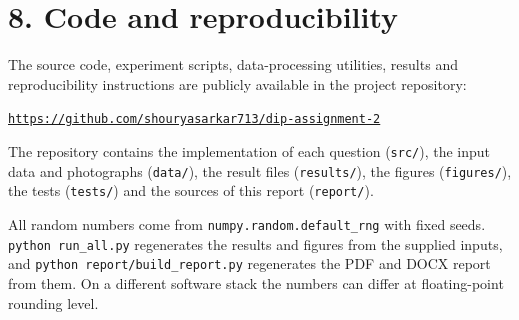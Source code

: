 \documentclass[10pt,a4paper]{article}
\begin{document}
\section{8. Code and reproducibility}
The source code, experiment scripts, data-processing utilities, results and reproducibility instructions are publicly available in the project repository:

\href{https://github.com/shouryasarkar713/dip-assignment-2}{\texttt{https:/\allowbreak{}/\allowbreak{}github.\allowbreak{}com/\allowbreak{}shouryasarkar713/\allowbreak{}dip-assignment-2}}

The repository contains the implementation of each question (\texttt{src/\allowbreak{}}), the input data and photographs (\texttt{data/\allowbreak{}}), the result files (\texttt{results/\allowbreak{}}), the figures (\texttt{figures/\allowbreak{}}), the tests (\texttt{tests/\allowbreak{}}) and the sources of this report (\texttt{report/\allowbreak{}}).

All random numbers come from \texttt{numpy.\allowbreak{}random.\allowbreak{}default\_\allowbreak{}rng} with fixed seeds. \texttt{python run\_\allowbreak{}all.\allowbreak{}py} regenerates the results and figures from the supplied inputs, and \texttt{python report/\allowbreak{}build\_\allowbreak{}report.\allowbreak{}py} regenerates the PDF and DOCX report from them. On a different software stack the numbers can differ at floating-point rounding level.
\end{document}
